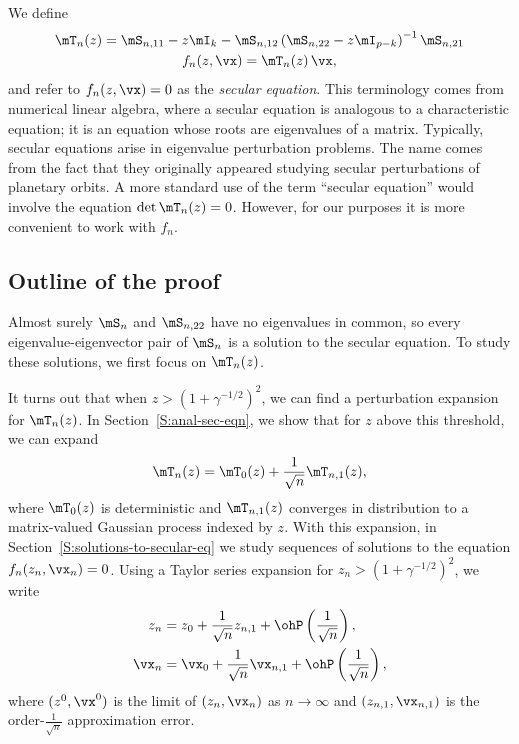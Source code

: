 We define
\begin{gather}
    \mT_n(z)
        =
            \mS_{n,11}
            -
            z
            \mI_k
            -
            \mS_{n,12}
            \left(
                \mS_{n,22}
                -
                z
                \mI_{p-k}
            \right)^{-1}
            \mS_{n,21}
            \label{E:secular-T} \\
    f_n ( z, \vx )
        =
            \mT_n(z) \,
            \vx, \label{E:secular-f}
\end{gather}
and refer to $f_n(z, \vx) = 0$ as the \emph{secular equation}. 
This terminology comes from numerical linear algebra, where a secular equation is analogous to a characteristic equation; it is an equation whose
roots are eigenvalues of a matrix.   Typically, secular equations arise in eigenvalue perturbation problems.  The name comes from the fact that they originally appeared studying secular perturbations of planetary orbits.  A more standard use of the term ``secular equation'' would involve the equation $\det \mT_n(z) = 0$.  However, for our purposes it is more convenient to work with $f_n$.

\subsection{Outline of the proof}

Almost surely $\mS_n$ and $\mS_{n,22}$ have no eigenvalues in common, so every eigenvalue-eigenvector pair of $\mS_n$ is a solution to the secular equation.  To study these solutions, we first focus on $\mT_n(z)$.  

It turns out that when $z > (1 + \gamma^{-1/2})^2$, we can find a perturbation expansion for $\mT_n(z)$. In Section~\ref{S:anal-sec-eqn}, we show that for $z$ above this threshold, we can expand
\[
    \mT_n(z)
        =
            \mT_0(z)
            +
            \frac{1}{\sqrt{n}}
            \mT_{n,1}(z),
\]
where $\mT_0(z)$ is deterministic and $\mT_{n,1}(z)$ converges in distribution
to a matrix-valued Gaussian process indexed by $z$.  With this expansion, in Section~\ref{S:solutions-to-secular-eq} we study sequences of solutions to the equation $f_n(z_n, \vx_n) = 0$.  Using a Taylor series expansion for $z_n > (1 + \gamma^{-1/2})^2$, we write
\begin{align*}
    z_n
        &= 
            z_0 
            + 
            \frac{1}{\sqrt{n}}
            z_{n,1} 
            + 
            \ohP\left( \frac{1}{\sqrt{n}} \right), \\
    \vx_n
        &=
            \vx_0
            +
            \frac{1}{\sqrt{n}}
            \vx_{n,1}
            + 
            \ohP\left( \frac{1}{\sqrt{n}} \right),
\end{align*}
where $(z^0, \vx^0)$ is the limit of $(z_n, \vx_n)$ as $n\to \infty$ and
$(z_{n,1}, \vx_{n,1})$ is the order-$\frac{1}{\sqrt{n}}$ approximation error.

